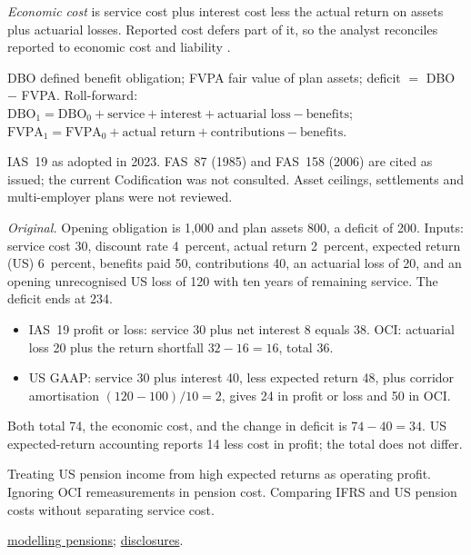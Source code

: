 \begin{qfmethod}
\emph{Economic cost} is service cost plus interest cost less the actual return on assets plus actuarial losses. Reported cost defers part of it, so the analyst reconciles reported to economic cost and liability \citep[pp.~163--165]{financial-statement-analysis-2009}.

 DBO defined benefit obligation; FVPA fair value of plan assets; deficit $=$ DBO $-$ FVPA. Roll-forward: $\text{DBO}_1=\text{DBO}_0+\text{service}+\text{interest}+\text{actuarial loss}-\text{benefits}$; $\text{FVPA}_1=\text{FVPA}_0+\text{actual return}+\text{contributions}-\text{benefits}$.

 IAS~19 as adopted in 2023. FAS~87 (1985) and FAS~158 (2006) are cited as issued; the current Codification was not consulted. Asset ceilings, settlements and multi-employer plans were not reviewed.

 \emph{Original.} Opening obligation is 1{,}000 and plan assets 800, a deficit of 200. Inputs: service cost 30, discount rate 4~percent, actual return 2~percent, expected return (US) 6~percent, benefits paid 50, contributions 40, an actuarial loss of 20, and an opening unrecognised US loss of 120 with ten years of remaining service. The deficit ends at 234.
\begin{itemize}
\item IAS~19 profit or loss: service 30 plus net interest 8 equals 38. OCI: actuarial loss 20 plus the return shortfall $32-16=16$, total 36.
\item US GAAP: service 30 plus interest 40, less expected return 48, plus corridor amortisation $(120-100)/10=2$, gives 24 in profit or loss and 50 in OCI.
\end{itemize}
Both total 74, the economic cost, and the change in deficit is $74-40=34$. US expected-return accounting reports 14 less cost in profit; the total does not differ.

 Treating US pension income from high expected returns as operating profit. Ignoring OCI remeasurements in pension cost. Comparing IFRS and US pension costs without separating service cost.

 \hyperref[meth:post-employment-benefit-modelling]{modelling pensions}; \hyperref[def:long-term-liability-compensation-disclosures]{disclosures}.

\end{qfmethod}

